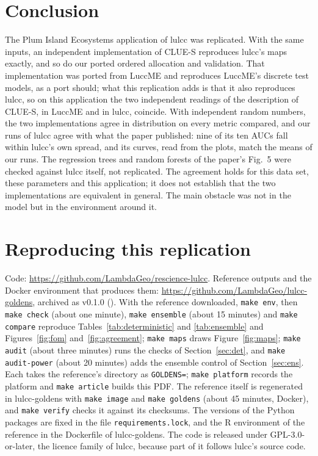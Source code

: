 \section{Conclusion}

The Plum Island Ecosystems application of lulcc was replicated. With the same inputs,
an independent implementation of CLUE-S reproduces lulcc's maps exactly, and so do our
ported ordered allocation and validation. That implementation was ported from LuccME
and reproduces LuccME's discrete test models, as a port should; what this replication adds is
that it also reproduces lulcc, so on this application the two independent readings of
the description of CLUE-S, in LuccME and in lulcc, coincide. With independent random numbers, the two implementations agree in distribution on every
metric compared, and our runs of lulcc agree with what the paper published: nine of its ten AUCs fall
within lulcc's own spread, and its curves, read from the plots, match the means of our
runs.
The regression trees and random forests of the paper's Fig.~5 were checked against lulcc
itself, not replicated. The agreement holds for this data set, these parameters and this
application; it does not establish that the two implementations are equivalent in
general. The main obstacle was
not in the model but in the environment around it.

\section*{Reproducing this replication}
\sloppy

Code: \url{https://github.com/LambdaGeo/rescience-lulcc}. Reference outputs and the
Docker environment that produces them: \url{https://github.com/LambdaGeo/lulcc-goldens},
archived as v0.1.0 ().
With the reference downloaded, \texttt{make env}, then \texttt{make check} (about one
minute), \texttt{make ensemble} (about 15 minutes) and \texttt{make compare} reproduce
Tables~\ref{tab:deterministic} and \ref{tab:ensemble} and Figures~\ref{fig:fom}
and~\ref{fig:agreement};
\texttt{make maps} draws Figure~\ref{fig:maps}; \texttt{make audit} (about three
minutes) runs the checks of Section~\ref{sec:det}, and \texttt{make audit-power} (about 20
minutes) adds the ensemble control of Section~\ref{sec:ens}. Each takes the reference's directory
as \texttt{GOLDENS=}; \texttt{make platform} records the platform and \texttt{make
article} builds this PDF. The reference itself is regenerated in lulcc-goldens with
\texttt{make image} and \texttt{make goldens} (about 45 minutes, Docker), and
\texttt{make verify} checks it against its checksums. The
versions of the Python packages are fixed in the file \texttt{requirements\allowbreak.lock}, and the R
environment of the reference in the Dockerfile of lulcc-goldens. The code is released
under GPL-3.0-or-later, the licence family of lulcc, because part of it follows lulcc's
source code.

